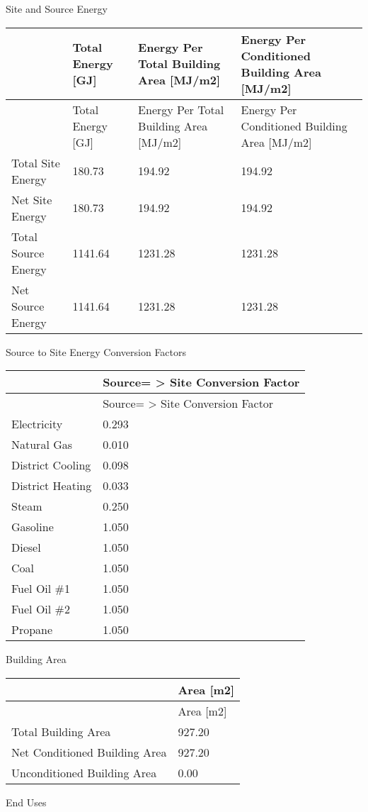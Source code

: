 Site and Source Energy

\begin{longtable}[c]{p{1.5in}p{1.5in}>{\raggedright}p{1.5in}>{\raggedright}p{1.5in}}
\toprule 
~ & Total Energy [GJ] & Energy Per Total Building Area [MJ/m2] & Energy Per Conditioned Building Area [MJ/m2] \tabularnewline
\midrule
\endfirsthead

\toprule 
~ & Total Energy [GJ] & Energy Per Total Building Area [MJ/m2] & Energy Per Conditioned Building Area [MJ/m2] \tabularnewline
\midrule
\endhead

Total Site Energy & 180.73 & 194.92 & 194.92 \tabularnewline
Net Site Energy & 180.73 & 194.92 & 194.92 \tabularnewline
Total Source Energy & 1141.64 & 1231.28 & 1231.28 \tabularnewline
Net Source Energy & 1141.64 & 1231.28 & 1231.28 \tabularnewline
\bottomrule
\end{longtable}

Source to Site Energy Conversion Factors

\begin{longtable}[c]{@{}ll@{}}
\toprule 
~ & Source= > Site Conversion Factor \tabularnewline
\midrule
\endfirsthead

\toprule 
~ & Source= > Site Conversion Factor \tabularnewline
\midrule
\endhead

Electricity & 0.293 \tabularnewline
Natural Gas & 0.010 \tabularnewline
District Cooling & 0.098 \tabularnewline
District Heating & 0.033 \tabularnewline
Steam & 0.250 \tabularnewline
Gasoline & 1.050 \tabularnewline
Diesel & 1.050 \tabularnewline
Coal & 1.050 \tabularnewline
Fuel Oil \#1 & 1.050 \tabularnewline
Fuel Oil \#2 & 1.050 \tabularnewline
Propane & 1.050 \tabularnewline
\bottomrule
\end{longtable}

Building Area

\begin{longtable}[c]{@{}ll@{}}
\toprule 
~ & Area [m2] \tabularnewline
\midrule
\endfirsthead

\toprule 
~ & Area [m2] \tabularnewline
\midrule
\endhead

Total Building Area & 927.20 \tabularnewline
Net Conditioned Building Area & 927.20 \tabularnewline
Unconditioned Building Area & 0.00 \tabularnewline
\bottomrule
\end{longtable}

End Uses

